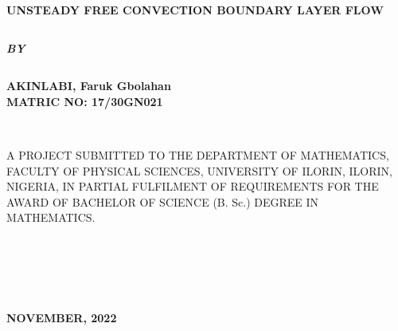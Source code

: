 \documentclass[11pt]{report}
\newcommand{\sps}{\\[0.2cm]}
\begin{document}
	\clearpage
	\thispagestyle{empty}
	\begin{center}
		{\bf \LARGE UNSTEADY FREE CONVECTION BOUNDARY LAYER FLOW }
	\end{center}
	$$$$
	\begin{center}
		\textbf{\itshape BY}
	\end{center} 
	$$$$
	\begin{center}
		{\bf AKINLABI, Faruk Gbolahan\\
			MATRIC NO: 17/30GN021}
	\end{center}
	~~~~~\\
	\hspace{9cm}
	\begin{center}
		A PROJECT SUBMITTED TO THE DEPARTMENT OF MATHEMATICS, FACULTY OF PHYSICAL SCIENCES, UNIVERSITY OF ILORIN, ILORIN, NIGERIA, IN PARTIAL FULFILMENT OF REQUIREMENTS FOR THE AWARD OF BACHELOR OF SCIENCE (B. Sc.) DEGREE IN MATHEMATICS.
	\end{center}
	~~~~~\\\sps
	\hspace{7cm}
	~~~~~\\\sps
	\begin{center}
		\textbf{NOVEMBER, 2022}
	\end{center}
	\newpage
\end{document}
